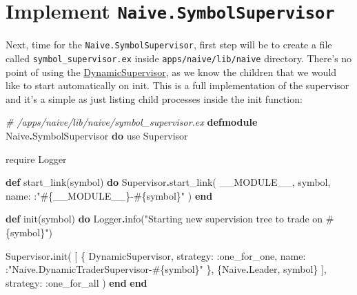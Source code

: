 \documentclass[
]{book}
\newenvironment{Shaded}{\begin{snugshade}}{\end{snugshade}}
\newcommand{\CommentTok}[1]{\textcolor[rgb]{0.56,0.35,0.01}{\textit{#1}}}
\newcommand{\ConstantTok}[1]{\textcolor[rgb]{0.00,0.00,0.00}{#1}}
\newcommand{\ImportTok}[1]{#1}
\newcommand{\KeywordTok}[1]{\textcolor[rgb]{0.13,0.29,0.53}{\textbf{#1}}}
\newcommand{\NormalTok}[1]{#1}
\newcommand{\OperatorTok}[1]{\textcolor[rgb]{0.81,0.36,0.00}{\textbf{#1}}}
\newcommand{\OtherTok}[1]{\textcolor[rgb]{0.56,0.35,0.01}{#1}}
\newcommand{\StringTok}[1]{\textcolor[rgb]{0.31,0.60,0.02}{#1}}
\newcommand{\VariableTok}[1]{\textcolor[rgb]{0.00,0.00,0.00}{#1}}
\begin{document}
\hypertarget{implement-naive.symbolsupervisor}{%
\section{\texorpdfstring{Implement \texttt{Naive.SymbolSupervisor}}{Implement Naive.SymbolSupervisor}}\label{implement-naive.symbolsupervisor}}

Next, time for the \texttt{Naive.SymbolSupervisor}, first step will be to create a file called \texttt{symbol\_supervisor.ex} inside \texttt{apps/naive/lib/naive} directory. There's no point of using the \href{https://hexdocs.pm/elixir/master/DynamicSupervisor.html}{DynamicSupervisor}, as we know the children that we would like to start automatically on init. This is a full implementation of the supervisor and it's a simple as just listing child processes inside the init function:

\begin{Shaded}
\begin{Highlighting}[]
\CommentTok{\# /apps/naive/lib/naive/symbol\_supervisor.ex}
\KeywordTok{defmodule} \ConstantTok{Naive}\OperatorTok{.}\ConstantTok{SymbolSupervisor} \KeywordTok{do}
  \ImportTok{use} \ConstantTok{Supervisor}

  \ImportTok{require} \ConstantTok{Logger}

  \KeywordTok{def}\NormalTok{ start\_link(symbol) }\KeywordTok{do}
    \ConstantTok{Supervisor}\OperatorTok{.}\NormalTok{start\_link(}
      \ConstantTok{\_\_MODULE\_\_}\NormalTok{,}
\NormalTok{      symbol,}
      \VariableTok{name:}\NormalTok{ :}\StringTok{"}\OtherTok{\#\{}\ConstantTok{\_\_MODULE\_\_}\OtherTok{\}}\StringTok{{-}}\OtherTok{\#\{}\NormalTok{symbol}\OtherTok{\}}\StringTok{"}
\NormalTok{    )}
  \KeywordTok{end}

  \KeywordTok{def}\NormalTok{ init(symbol) }\KeywordTok{do}
    \ConstantTok{Logger}\OperatorTok{.}\NormalTok{info(}\StringTok{"Starting new supervision tree to trade on }\OtherTok{\#\{}\NormalTok{symbol}\OtherTok{\}}\StringTok{"}\NormalTok{)}

    \ConstantTok{Supervisor}\OperatorTok{.}\NormalTok{init(}
\NormalTok{      [}
\NormalTok{        \{}
          \ConstantTok{DynamicSupervisor}\NormalTok{,}
          \VariableTok{strategy:} \VariableTok{:one\_for\_one}\NormalTok{,}
          \VariableTok{name:}\NormalTok{ :}\StringTok{"Naive.DynamicTraderSupervisor{-}}\OtherTok{\#\{}\NormalTok{symbol}\OtherTok{\}}\StringTok{"}
\NormalTok{        \},}
\NormalTok{        \{}\ConstantTok{Naive}\OperatorTok{.}\ConstantTok{Leader}\NormalTok{, symbol\}}
\NormalTok{      ],}
      \VariableTok{strategy:} \VariableTok{:one\_for\_all}
\NormalTok{    )}
  \KeywordTok{end}
\KeywordTok{end}
\end{Highlighting}
\end{Shaded}
\end{document}
